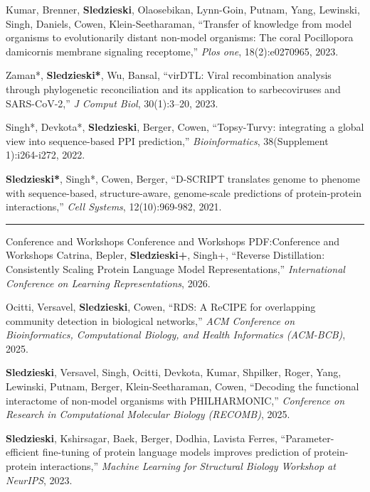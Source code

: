 \documentclass[letterpaper,MMMyyyy,nonstopmode]{simpleresumecv}
\begin{document}
\begin{Body}
\Gap
\NumberedItem{[4]}
{{Kumar, Brenner, \textbf{Sledzieski}, Olaosebikan, Lynn-Goin, Putnam, Yang, Lewinski, Singh, Daniels, Cowen, Klein-Seetharaman}, 
``Transfer of knowledge from model organisms to evolutionarily distant non-model organisms: The coral Pocillopora damicornis membrane signaling receptome,'' 
\textit{Plos one}, 18(2):e0270965, 2023.
}

\Gap
\NumberedItem{[3]}
{{Zaman*, \textbf{Sledzieski*}, Wu, Bansal}, 
``virDTL: Viral recombination analysis through phylogenetic reconciliation and its application to sarbecoviruses and SARS-CoV-2,'' 
\textit{J Comput Biol}, 30(1):3--20, 2023.
}

\Gap
\NumberedItem{[2]}
{{Singh*, Devkota*, \textbf{Sledzieski}, Berger, Cowen}, 
``Topsy-Turvy: integrating a global view into sequence-based PPI prediction,'' 
\textit{Bioinformatics}, 38(Supplement 1):i264-i272, 2022.
}

\Gap
\NumberedItem{[1]}
{{\textbf{Sledzieski*}, Singh*, Cowen, Berger}, 
``D-SCRIPT translates genome to phenome with sequence-based, structure-aware, genome-scale predictions of protein-protein interactions,'' 
\textit{Cell Systems}, 12(10):969-982, 2021.
}


\BigGap
\hrule
\Section
{Conference and Workshops}
{Conference and Workshops}
{PDF:Conference and Workshops}
\Gap
\NumberedItem{[8]}
{{Catrina, Bepler, \textbf{Sledzieski+}, Singh+}, 
``Reverse Distillation: Consistently Scaling Protein Language Model Representations,'' 
\textit{International Conference on Learning Representations}, 2026.
}

\Gap
\NumberedItem{[7]}
{{Ocitti, Versavel, \textbf{Sledzieski}, Cowen}, 
``RDS: A ReCIPE for overlapping community detection in biological networks,'' 
\textit{ACM Conference on Bioinformatics, Computational Biology, and Health Informatics (ACM-BCB)}, 2025.
}

\Gap
\NumberedItem{[6]}
{{\textbf{Sledzieski}, Versavel, Singh, Ocitti, Devkota, Kumar, Shpilker, Roger, Yang, Lewinski, Putnam, Berger, Klein-Seetharaman, Cowen}, 
``Decoding the functional interactome of non-model organisms with PHILHARMONIC,'' 
\textit{Conference on Research in Computational Molecular Biology (RECOMB)}, 2025.
}

\Gap
\NumberedItem{[5]}
{{\textbf{Sledzieski}, Kshirsagar, Baek, Berger, Dodhia, Lavista Ferres}, 
``Parameter-efficient fine-tuning of protein language models improves prediction of protein-protein interactions,'' 
\textit{Machine Learning for Structural Biology Workshop at NeurIPS}, 2023.
}


\end{Body}
\end{document}
